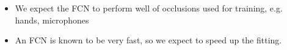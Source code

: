 	\begin{itemize}
		\item We expect the FCN to perform well of occlusions used for training, e.g. hands, microphones
		\item An FCN is known to be very fast, so we expect to speed up the fitting.
	\end{itemize}




